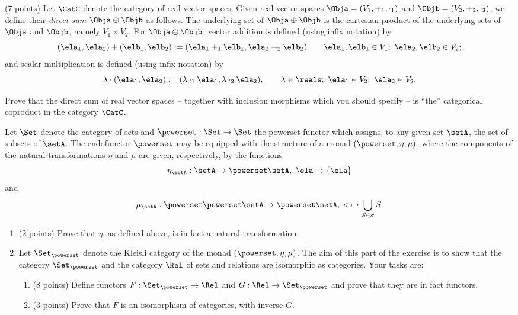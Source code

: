 \documentclass[paper=8.125in:10.250in,pagesize=pdftex,
    headinclude=false,footinclude=false,oneside,egregdoesnotlikesansseriftitles]{kaobook}
\begin{document}
\begin{gradedexercise}
(7 points) Let $\CatC$ denote the category of real vector spaces. Given real vector spaces $\Obja = (V_1, +_1, \cdot_1)$ and $\Objb = (V_2, +_2, \cdot_2)$, we define their \emph{direct sum} $\Obja \oplus \Objb$ as follows. 
The underlying set of $\Obja \oplus \Objb$ is the cartesian product of the underlying sets of $\Obja$ and $\Objb$, namely $V_1 \times V_2$. For $\Obja \oplus \Objb$, vector addition is defined (using infix notation) by
$$(\ela_1, \ela_2) + (\elb_1, \elb_2) := (\ela_1 +_1 \elb_1, \ela_2 +_2 \elb_2) \quad \quad \ela_1, \elb_1 \in V_1; \ \ela_2, \elb_2 \in V_2;$$
and scalar multiplication is defined (using infix notation) by
$$\lambda \cdot (\ela_1, \ela_2) := (\lambda \cdot_1 \ela_1, \lambda \cdot_2 \ela_2), \quad \quad \lambda \in \reals; \ \ela_1 \in V_2; \ \ela_2 \in V_2.$$

Prove that the direct sum of real vector spaces -- together with inclusion morphisms which you should specify -- is ``the'' categorical coproduct in the category $\CatC$. 
\end{gradedexercise}




\begin{gradedexercise}
Let $\Set$ denote the category of sets and $\powerset : \Set \to \Set$ the powerset functor which assigns, to any given set $\setA$, the set of subsets of $\setA$. The endofunctor $\powerset$ may be equipped with the structure of a monad $(\powerset, \eta, \mu)$, where the components of the natural transformations $\eta$ and $\mu$ are given, respectively, by the functions
$$ \eta_{\setA} : \setA \to \powerset \setA, \ \ela \mapsto \{ \ela \}$$
and
$$ \mu_{\setA} : \powerset \powerset \setA \to \powerset \setA, \ \sigma \mapsto \bigcup_{S \in \sigma} S.$$

\begin{enumerate}
\item (2 points) Prove that $\eta$, as defined above, is in fact a natural transformation. 
\item Let $\Set_{\powerset}$ denote the Kleisli category of the monad $(\powerset, \eta, \mu)$. The aim of this part of the exercise is to show that the category $\Set_{\powerset}$ and the category $\Rel$ of sets and relations are isomorphic as categories. Your tasks are:
\begin{enumerate}
\item (8 points) Define functors $F: \Set_{\powerset} \to \Rel$ and $G: \Rel \to \Set_{\powerset} $ and prove that they are in fact functors. 
\item (3 points) Prove that $F$ is an isomorphism of categories, with inverse $G$. 
\end{enumerate}
\end{enumerate}

\end{gradedexercise}
\end{document}
